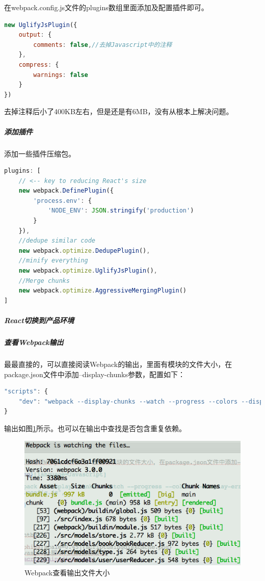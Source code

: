 \documentclass[12pt]{book}
\numberwithin{dummy}{section}
\theoremstyle{ocrenumbox}
\theoremstyle{blacknumex}
\theoremstyle{blacknumbox}
\theoremstyle{ocrenum}
\begin{document}
在webpack.config.js文件的plugins数组里面添加及配置插件即可。

\begin{lstlisting}[language=Javascript]
new UglifyJsPlugin({
	output: {
		comments: false,//去掉Javascript中的注释
	},
	compress: {
		warnings: false
	}
})
\end{lstlisting}

去掉注释后小了400KB左右，但是还是有6MB，没有从根本上解决问题。

\subparagraph{添加插件}

添加一些插件压缩包。

\begin{lstlisting}[language=Javascript]
plugins: [
	// <-- key to reducing React's size
	new webpack.DefinePlugin({ 
		'process.env': {
			'NODE_ENV': JSON.stringify('production')
		}
	}),
	//dedupe similar code
	new webpack.optimize.DedupePlugin(),
	//minify everything  
	new webpack.optimize.UglifyJsPlugin(), 
	//Merge chunks
	new webpack.optimize.AggressiveMergingPlugin() 
]
\end{lstlisting}


\subparagraph{React切换到产品环境}

\subparagraph{查看Webpack输出}

最最直接的，可以直接阅读Webpack的输出，里面有模块的文件大小，在package.json文件中添加--display-chunks参数，配置如下：

\begin{lstlisting}[language=Javascript]
"scripts": {
	"dev": "webpack --display-chunks --watch --progress --colors --display-error-details --config webpack/dev.config.js",
}
\end{lstlisting}


输出如图\ref{fig:webpackcheckingfilesize}所示。也可以在输出中查找是否包含重复依赖。

\begin{figure}[htbp]
	\centering
	\includegraphics[scale=0.7]{webpackcheckingfilesize.png}
	\caption{Webpack查看输出文件大小}
	\label{fig:webpackcheckingfilesize}
\end{figure}
\end{document}
